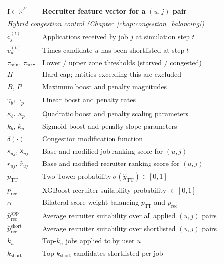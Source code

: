 \begin{longtable}{@{}ll@{}}
    $\mathbf{f} \in \mathbb{R}^F$  & Recruiter feature vector for a $(u,j)$ pair \\
    \midrule
    \multicolumn{2}{l}{\textit{Hybrid congestion control
        (Chapter~\ref{chap:congestion_balancing})}} \\
    \midrule
    $c_j^{(t)}$                    & Applications received by job $j$ at simulation step $t$ \\
    $v_u^{(t)}$                    & Times candidate $u$ has been shortlisted at step $t$ \\[4pt]
    $\tau_{\min},\,\tau_{\max}$    & Lower / upper zone thresholds (starved / congested) \\
    $H$                            & Hard cap; entities exceeding this are excluded \\
    $B,\,P$                        & Maximum boost and penalty magnitudes \\
    $\gamma_b,\,\gamma_p$          & Linear boost and penalty rates \\
    $\kappa_b,\,\kappa_p$          & Quadratic boost and penalty scaling parameters \\
    $k_b,\,k_p$                & Sigmoid boost and penalty slope parameters \\
    $\delta(\cdot)$                & Congestion modification function \\[4pt]
    $s_{uj},\,\hat{s}_{uj}$        & Base and modified job-ranking score for $(u,j)$ \\
    $r_{uj},\,\hat{r}_{uj}$        & Base and modified recruiter ranking score for $(u,j)$ \\
    $p_{\text{TT}}$                & Two-Tower probability $\sigma(\hat{y}_{\text{TT}}) \in [0,1]$ \\
    $p_{\text{rec}}$               & XGBoost recruiter suitability probability $\in [0,1]$ \\
    $\alpha$                       & Bilateral score weight balancing $p_{\text{TT}}$ and $p_{\text{rec}}$ \\
    $\bar{p}_{\text{rec}}^{\text{app}}$
                                   & Average recruiter suitability over all applied $(u,j)$ pairs \\
    $\bar{p}_{\text{rec}}^{\text{short}}$
                                   & Average recruiter suitability over shortlisted $(u,j)$ pairs \\
$k_u$              & Top-$k_u$ jobs applied to by user $u$ \\
$k_{\text{short}}$ & Top-$k_{\text{short}}$ candidates shortlisted per job \\
\end{longtable}


